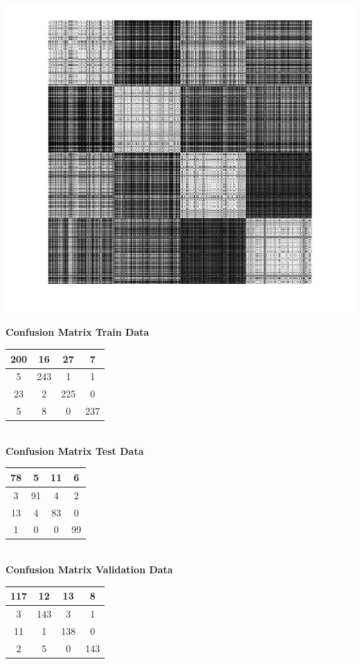 \documentclass{article}
\begin{document}
\begin{center}
\includegraphics[scale=.6]{Classification/1c/nu_g/kgm}
\end{center}

\begin{flushleft}
\textbf{Confusion Matrix Train Data\\[5pt]}
\begin{tabular}{|c|c|c|c|}
\hline
200 & 16 & 27 & 7 \\
\hline
5 & 243 & 1 & 1 \\
\hline
23 & 2 & 225 & 0 \\
\hline
5 & 8 & 0 & 237 \\
\hline
\end{tabular}
\textbf{\\[10pt] Confusion Matrix Test Data \\[5pt]}
\begin{tabular}{|c|c|c|c|}
\hline
78 & 5 & 11 & 6 \\
\hline
3 & 91 & 4 & 2 \\
\hline
13 & 4 & 83 & 0 \\
\hline
1 & 0 & 0 & 99 \\
\hline
\end{tabular}
\textbf{\\[10pt] Confusion Matrix Validation Data \\[5pt]}
\begin{tabular}{|c|c|c|c|}
\hline
117 & 12 & 13 & 8 \\
\hline
3 & 143 & 3 & 1 \\
\hline
11 & 1 & 138 & 0 \\
\hline
2 & 5 & 0 & 143 \\
\hline
\end{tabular}
\end{flushleft}
\end{document}

